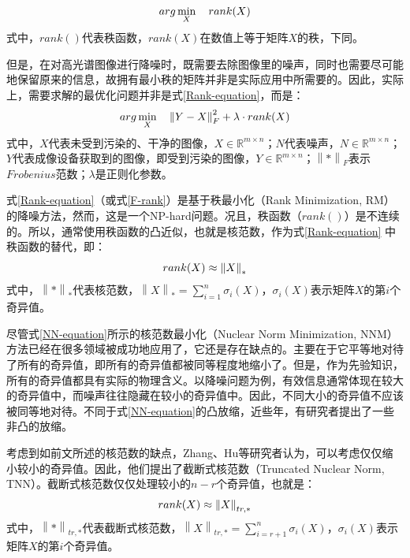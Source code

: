 \documentclass[12pt, a4paper]{article}
\begin{document}
\begin{equation}
\centering
arg\min\limits_{X} \quad rank(X)
\label{Rank-equation}
\end{equation}
式中，$rank()$代表秩函数，$rank(X)$在数值上等于矩阵$X$的秩，下同。
\par 但是，在对高光谱图像进行降噪时，既需要去除图像里的噪声，同时也需要尽可能地保留原来的信息\cite{log-norm}，故拥有最小秩的矩阵并非是实际应用中所需要的\cite{log-norm}。因此，实际上，需要求解的最优化问题并非是式\ref{Rank-equation}，而是：
\begin{equation}
\centering
arg\min\limits_{X} \quad \left\|Y-X\right\|_F^2 + \lambda \cdot rank(X)
\label{F-rank}
\end{equation}
式中，$X$代表未受到污染的、干净的图像，$X \in \mathbb{R}^{m \times n}$；$N$代表噪声，$N \in \mathbb{R}^{m \times n}$；$Y$代表成像设备获取到的图像，即受到污染的图像，$Y \in \mathbb{R}^{m \times n}$；$\left\|*\right\|_F$表示$Frobenius$范数；$\lambda$是正则化参数。
\par 式\ref{Rank-equation}（或式\ref{F-rank}）是基于秩最小化（Rank Minimization, RM）的降噪方法，然而，这是一个NP-hard问题\cite{TNN-1}。况且，秩函数（$rank()$）是不连续的\cite{TNN-1}。所以，通常使用秩函数的凸近似，也就是核范数，作为式\ref{Rank-equation} 中秩函数的替代\cite{TNN-1}，即：
\begin{equation}
\centering
rank(X) \approx \left\|X\right\|_*
\label{NN-equation}
\end{equation}
式中，$\left\|*\right\|_*$代表核范数，$\left\|X\right\|_* = \sum\limits_{i=1}^{n}\sigma_i(X)$，$\sigma_i(X)$表示矩阵$X$的第$i$个奇异值。
\par 尽管式\ref{NN-equation}所示的核范数最小化（Nuclear Norm Minimization, NNM）方法已经在很多领域被成功地应用了，它还是存在缺点的。主要在于它平等地对待了所有的奇异值，即所有的奇异值都被同等程度地缩小了\cite{Review}。但是，作为先验知识，所有的奇异值都具有实际的物理含义。以降噪问题为例，有效信息通常体现在较大的奇异值中，而噪声往往隐藏在较小的奇异值中。因此，不同大小的奇异值不应该被同等地对待\cite{WNN-1}。不同于式\ref{NN-equation}的凸放缩，近些年，有研究者提出了一些非凸的放缩。
\par 考虑到如前文所述的核范数的缺点，Zhang、Hu等研究者认为，可以考虑仅仅缩小较小的奇异值\cite{TNN-1}。因此，他们提出了截断式核范数（Truncated Nuclear Norm, TNN）。截断式核范数仅仅处理较小的$n-r$个奇异值，也就是：
\begin{equation}
\centering
rank(X) \approx \left\|X\right\|_{tr,*}
\label{TNN-equation}
\end{equation}
式中，$\left\|*\right\|_{tr,*}$代表截断式核范数，$\left\|X\right\|_{tr,*} = \sum\limits_{i=r+1}^{n}\sigma_i(X)$，$\sigma_i(X)$表示矩阵$X$的第$i$个奇异值。
\end{document}
